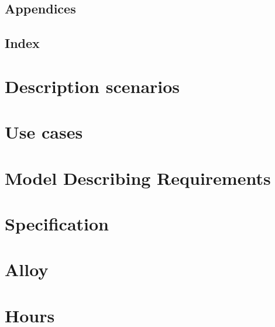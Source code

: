   \subsection{Appendices}
  \subsection{Index}

\section{Description scenarios}

\section{Use cases}

\section{Model Describing Requirements}

\section{Specification}

\section{Alloy}

\section{Hours}
